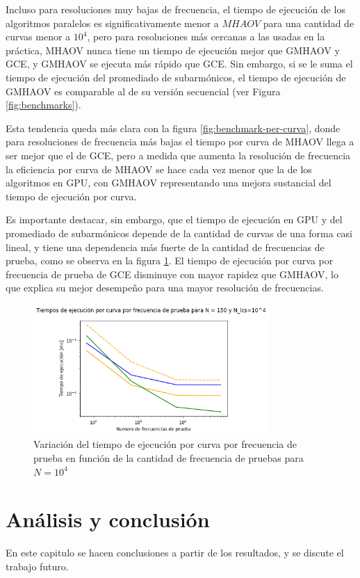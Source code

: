 Incluso para resoluciones muy bajas de frecuencia, el tiempo de ejecución de los algoritmos paralelos es significativamente menor a $MHAOV$ para una cantidad de curvas menor a $10^{4}$, pero para resoluciones más cercanas a las usadas en la práctica, MHAOV nunca tiene un tiempo de ejecución mejor que GMHAOV y GCE, y GMHAOV se ejecuta más rápido que GCE. Sin embargo, si se le suma el tiempo de ejecución del promediado de subarmónicos, el tiempo de ejecución de GMHAOV es comparable al de su versión secuencial (ver Figura \ref{fig:benchmarks}).

Esta tendencia queda más clara con la figura \ref{fig:benchmark-per-curva}, donde para resoluciones de frecuencia más bajas el tiempo por curva de MHAOV llega a ser mejor que el de GCE, pero a medida que aumenta la resolución de frecuencia la eficiencia por curva de  MHAOV se hace cada vez menor que la de los algoritmos en GPU, con GMHAOV representando una mejora sustancial del tiempo de ejecución por curva.

Es importante destacar, sin embargo, que el tiempo de ejecución en GPU y del promediado de subarmónicos depende de la cantidad de curvas de una forma casi lineal, y tiene una dependencia más fuerte de la cantidad de frecuencias de prueba, como se observa en la figura \ref{fig:benchmark-frecuencias-prueba}. El tiempo de ejecución por curva por frecuencia de prueba de GCE disminuye con mayor rapidez que GMHAOV, lo que explica su mejor desempeño para una mayor resolución de frecuencias.

\begin{figure}[H]
    \centering
    \includegraphics[width=0.8\textwidth]{figs/benchmarks-frequency.png}
    \caption{Variación del tiempo de ejecución por curva por frecuencia de prueba en función de la cantidad de frecuencia de pruebas para $N=10^{4}$}
    \label{fig:benchmark-frecuencias-prueba}
\end{figure}

\chapter{Análisis y conclusión}\label{chap:conclusión}
En este capitulo se hacen conclusiones a partir de los resultados, y se discute el trabajo futuro.

